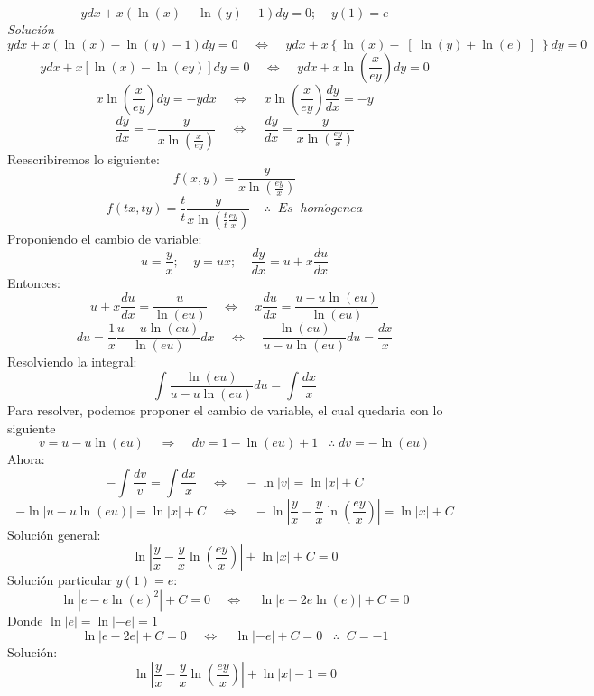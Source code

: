 \documentclass[10pt,executivepaper]{article}
\begin{document}
\clearpage
\[ydx+x\left(\ln(x)-\ln(y)-1\right)dy=0;\;\;\;\;y(1)=e\]
\textit{Solución}
\[ydx+x(\ln(x)-\ln(y)-1)dy=0\;\;\;\;\Leftrightarrow\;\;\;\;ydx+x\left\{\ln(x)-\right[\ln(y)+\ln(e)\left]\right\}dy=0\]
\[ydx+x\left[\ln(x)-\ln(ey)\right]dy=0\;\;\;\;\Leftrightarrow\;\;\;\;ydx+x\ln\left(\frac{x}{ey}\right)dy=0\]
\[x\ln\left(\frac{x}{ey}\right)dy=-ydx\;\;\;\;\Leftrightarrow\;\;\;\;x\ln\left(\frac{x}{ey}\right)\frac{dy}{dx}=-y\]
\[\frac{dy}{dx}=-\frac{y}{x\ln\left(\frac{x}{ey}\right)}\;\;\;\;\Leftrightarrow\;\;\;\;\frac{dy}{dx}=\frac{y}{x\ln\left(\frac{ey}{x}\right)}\]
Reescribiremos lo siguiente:
\[f(x,y)=\frac{y}{x\ln\left(\frac{ey}{x}\right)}\]
\[f(tx,ty)=\frac{t}{t}\frac{y}{x\ln\left(\frac{t}{t}\frac{ey}{x}\right)}\;\;\;\;\therefore\;\;Es\;\;hom\acute{o}genea\]
Proponiendo el cambio de variable:
\[u=\frac{y}{x};\;\;\;\;y=ux;\;\;\;\;\frac{dy}{dx}=u+x\frac{du}{dx}\]
Entonces:
\[u+x\frac{du}{dx}=\frac{u}{\ln(eu)}\;\;\;\;\Leftrightarrow\;\;\;\;x\frac{du}{dx}=\frac{u-u\ln(eu)}{\ln(eu)}\]
\[du=\frac{1}{x}\frac{u-u\ln(eu)}{\ln(eu)}dx\;\;\;\;\Leftrightarrow\;\;\;\;\frac{\ln(eu)}{u-u\ln(eu)}du=\frac{dx}{x}\]
Resolviendo la integral:
\[\int\frac{\ln(eu)}{u-u\ln(eu)}du=\int\frac{dx}{x}\]
Para resolver, podemos proponer el cambio de variable, el cual quedaria con lo siguiente
\[v=u-u\ln(eu)\;\;\;\;\Rightarrow\;\;\;\;dv=1-\ln(eu)+1\;\;\;\therefore\;dv=-\ln(eu)\]
Ahora:
\[-\int\frac{dv}{v}=\int\frac{dx}{x}\;\;\;\;\Leftrightarrow\;\;\;\;-\ln|v|=\ln|x|+C\]
\[-\ln|u-u\ln(eu)|=\ln|x|+C\;\;\;\;\Leftrightarrow\;\;\;\;-\ln\left|\frac{y}{x}-\frac{y}{x}\ln\left(\frac{ey}{x}\right)\right|=\ln|x|+C\]
Solución general:
\[\ln\left|\frac{y}{x}-\frac{y}{x}\ln\left(\frac{ey}{x}\right)\right|+\ln|x|+C=0\]
Solución particular $y(1)=e$:
\[\ln\left|e-e\ln(e)^{2}\right|+C=0\;\;\;\;\Leftrightarrow\;\;\;\;\ln\left|e-2e\ln(e)\right|+C=0\]
Donde $\ln|e|=\ln|-e|=1$
\[\ln|e-2e|+C=0\;\;\;\;\Leftrightarrow\;\;\;\;\ln|-e|+C=0\;\;\;\therefore\;\;C=-1\]
Solución:
\[\ln\left|\frac{y}{x}-\frac{y}{x}\ln\left(\frac{ey}{x}\right)\right|+\ln|x|-1=0\]
\clearpage
\end{document}
